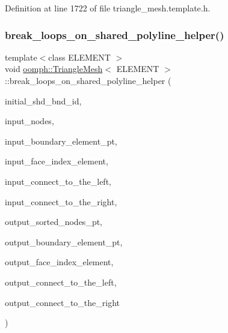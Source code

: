 Definition at line 1722 of file triangle\+\_\+mesh.\+template.\+h.

\mbox{\label{classoomph_1_1TriangleMesh_a191f27cfdca85947cb9391f6d593723f}} 
\subsubsection{\texorpdfstring{break\+\_\+loops\+\_\+on\+\_\+shared\+\_\+polyline\+\_\+helper()}{break\_loops\_on\_shared\_polyline\_helper()}}
{\footnotesize\ttfamily template$<$class E\+L\+E\+M\+E\+NT $>$ \\
void \hyperlink{classoomph_1_1TriangleMesh}{oomph\+::\+Triangle\+Mesh}$<$ E\+L\+E\+M\+E\+NT $>$\+::break\+\_\+loops\+\_\+on\+\_\+shared\+\_\+polyline\+\_\+helper (\begin{DoxyParamCaption}\item[{const unsigned \&}]{initial\+\_\+shd\+\_\+bnd\+\_\+id,  }\item[{std\+::list$<$ \hyperlink{classoomph_1_1Node}{Node} $\ast$$>$ \&}]{input\+\_\+nodes,  }\item[{\hyperlink{classoomph_1_1Vector}{Vector}$<$ \hyperlink{classoomph_1_1FiniteElement}{Finite\+Element} $\ast$$>$ \&}]{input\+\_\+boundary\+\_\+element\+\_\+pt,  }\item[{\hyperlink{classoomph_1_1Vector}{Vector}$<$ int $>$ \&}]{input\+\_\+face\+\_\+index\+\_\+element,  }\item[{const int \&}]{input\+\_\+connect\+\_\+to\+\_\+the\+\_\+left,  }\item[{const int \&}]{input\+\_\+connect\+\_\+to\+\_\+the\+\_\+right,  }\item[{\hyperlink{classoomph_1_1Vector}{Vector}$<$ std\+::list$<$ \hyperlink{classoomph_1_1Node}{Node} $\ast$$>$ $>$ \&}]{output\+\_\+sorted\+\_\+nodes\+\_\+pt,  }\item[{\hyperlink{classoomph_1_1Vector}{Vector}$<$ \hyperlink{classoomph_1_1Vector}{Vector}$<$ \hyperlink{classoomph_1_1FiniteElement}{Finite\+Element} $\ast$$>$ $>$ \&}]{output\+\_\+boundary\+\_\+element\+\_\+pt,  }\item[{\hyperlink{classoomph_1_1Vector}{Vector}$<$ \hyperlink{classoomph_1_1Vector}{Vector}$<$ int $>$ $>$ \&}]{output\+\_\+face\+\_\+index\+\_\+element,  }\item[{\hyperlink{classoomph_1_1Vector}{Vector}$<$ int $>$ \&}]{output\+\_\+connect\+\_\+to\+\_\+the\+\_\+left,  }\item[{\hyperlink{classoomph_1_1Vector}{Vector}$<$ int $>$ \&}]{output\+\_\+connect\+\_\+to\+\_\+the\+\_\+right }\end{DoxyParamCaption})\hspace{0.3cm}{\ttfamily [protected]}}



